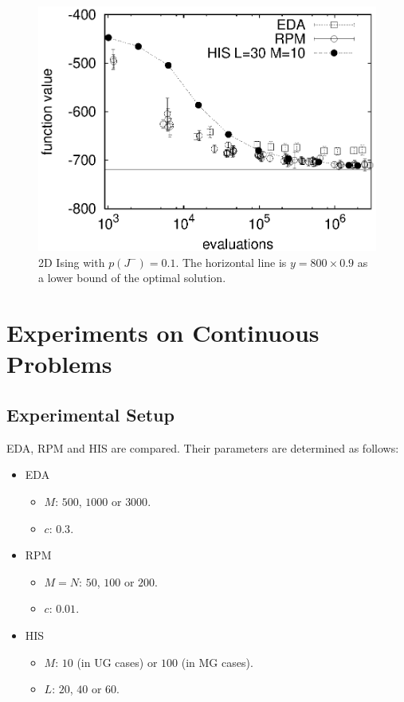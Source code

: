 \begin{figure}[tbp]
\centerline{
\includegraphics[width=\figlength\linewidth]{./data_aexp/2d_90.eps}}
\caption{2D Ising with $p(J^{-})=0.1$.
The horizontal line is
 $y=800\times 0.9$ as a lower bound of the optimal solution.}
\label{result-2d-flust10}
\end{figure}



\section{Experiments on Continuous Problems}
\subsection{Experimental Setup}
EDA, RPM and HIS are compared.
Their parameters are determined as follows:
\begin{itemize}
 \item EDA
       \begin{itemize}
	\item $M$: $500$, $1000$ or $3000$.
	\item $c$:  $0.3$.
       \end{itemize}
 \item RPM
       \begin{itemize}
	\item $M=N$: $50$, $100$ or $200$.
	\item $c$: $0.01$.      
       \end{itemize}
 \item HIS
       \begin{itemize}
	\item $M$: $10$ (in UG cases) or $100$ (in MG cases).
	\item $L$: $20$, $40$ or $60$.
       \end{itemize}
\end{itemize}

